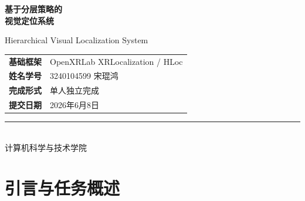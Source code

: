 \documentclass[12pt,a4paper]{ctexart}
\begin{document}

\begin{titlepage}
\centering

\vspace*{3cm}

{\fontsize{32}{38}\selectfont\bfseries\color{primary} 基于分层策略的\\[8pt] 视觉定位系统 \par}

\vspace{1.5cm}

{\Large\color{primary!80} Hierarchical Visual Localization System}

\vspace{2.5cm}


\vspace{2.5cm}

{\large
\begin{tabular}{rl}
  \textbf{基础框架} & OpenXRLab XRLocalization / HLoc \\[6pt]
  \textbf{姓名学号} & 3240104599 宋琨鸿 \\[6pt]
  \textbf{完成形式} & 单人独立完成 \\[6pt]
  \textbf{提交日期} & 2026年6月8日
\end{tabular}
}

\vfill
{\small\color{primary!50}\rule{0.4\textwidth}{0.3pt}\\ 计算机科学与技术学院}

\end{titlepage}


\tableofcontents
\newpage

\section{引言与任务概述}
\end{document}
